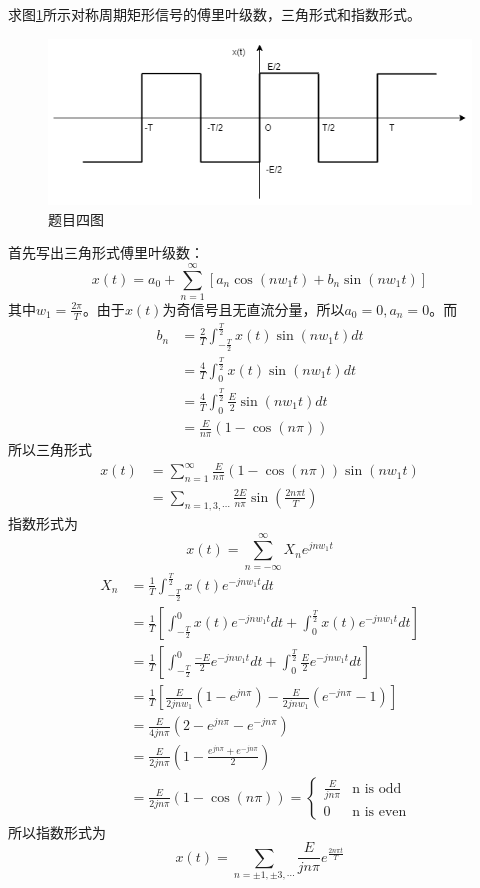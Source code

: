 \documentclass[answers]{exam}  %
\begin{document}
\begin{questions}
\question 求图\ref{fig:4}所示对称周期矩形信号的傅里叶级数，三角形式和指数形式。

\begin{figure}
	\centering
	\includegraphics[width=\linewidth]{pics/dsp2-5.png}
	\caption{题目四图}
	\label{fig:4}
\end{figure}

\begin{solution}
	首先写出三角形式傅里叶级数：$$x(t)=a_0+\sum_{n=1}^{\infty}[a_n\cos(nw_1t)+b_n\sin(nw_1t)]$$其中$w_1=\frac{2\pi}{T}$。由于$x(t)$为奇信号且无直流分量，所以$a_0=0,a_n=0$。而
	\begin{align*}
		b_n&=\frac{2}{T}\int_{-\frac{T}{2}}^{\frac{T}{2}}x(t)\sin(nw_1t)dt\\
		&=\frac{4}{T}\int_{0}^{\frac{T}{2}}x(t)\sin(nw_1t)dt\\
		&=\frac{4}{T}\int_{0}^{\frac{T}{2}}\frac{E}{2}\sin(nw_1t)dt\\
		&=\frac{E}{n\pi}(1-\cos(n\pi))
	\end{align*}
    所以三角形式
    \begin{align*}
    	x(t)&=\sum_{n=1}^{\infty}\frac{E}{n\pi}(1-\cos(n\pi))\sin(nw_1t)\\
    	&=\sum_{n=1,3,\cdots}\frac{2E}{n\pi}\sin(\frac{2n\pi t}{T})
    \end{align*}
    指数形式为$$x(t)=\sum_{n=-\infty}^{\infty}X_ne^{jnw_1t}$$
    \begin{align*}
    	X_n&=\frac{1}{T}\int_{-\frac{T}{2}}^{\frac{T}{2}}x(t)e^{-jnw_1t}dt\\
    	   &=\frac{1}{T}[\int_{-\frac{T}{2}}^{0}x(t)e^{-jnw_1t}dt+\int_{0}^{
    	    \frac{T}{2}}x(t)e^{-jnw_1t}dt]\\
           &=\frac{1}{T}[\int_{-\frac{T}{2}}^{0}\frac{-E}{2}e^{-jnw_1t}dt+\int_{0}^{
           	\frac{T}{2}}\frac{E}{2}e^{-jnw_1t}dt]\\
           &=\frac{1}{T}[\frac{E}{2jnw_1}(1-e^{jn\pi})-\frac{E}{2jnw_1}(e^{-jn\pi}-1)]\\
           &=\frac{E}{4jn\pi}(2-e^{jn\pi}-e^{-jn\pi})\\
           &=\frac{E}{2jn\pi}(1-\frac{e^{jn\pi}+e^{-jn\pi}}{2})\\
           &=\frac{E}{2jn\pi}(1-\cos(n\pi))=\begin{cases}
           	\frac{E}{jn\pi} & \text{n is odd}\\
           	 0 & \text{n is even}
                       \end{cases}
    \end{align*}
    所以指数形式为$$x(t)=\sum_{n=\pm1,\pm3,\cdots}\frac{E}{jn\pi}e^{\frac{2n\pi t}{T}}$$
\end{solution}


\end{questions}
\end{document}
